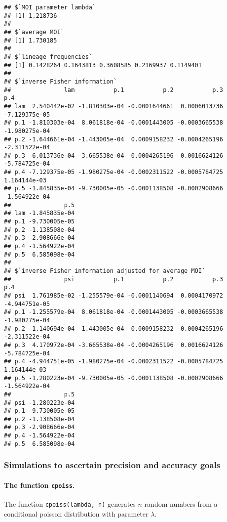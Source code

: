 \documentclass[
]{article}
\begin{document}
\begin{verbatim}
## $`MOI parameter lambda`
## [1] 1.218736
## 
## $`average MOI`
## [1] 1.730185
## 
## $`lineage frequencies`
## [1] 0.1428264 0.1643813 0.3608585 0.2169937 0.1149401
## 
## $`inverse Fisher information`
##               lam           p.1           p.2           p.3           p.4
## lam  2.540442e-02 -1.810303e-04 -0.0001644661  0.0006013736 -7.129375e-05
## p.1 -1.810303e-04  8.061818e-04 -0.0001443005 -0.0003665538 -1.980275e-04
## p.2 -1.644661e-04 -1.443005e-04  0.0009158232 -0.0004265196 -2.311522e-04
## p.3  6.013736e-04 -3.665538e-04 -0.0004265196  0.0016624126 -5.784725e-04
## p.4 -7.129375e-05 -1.980275e-04 -0.0002311522 -0.0005784725  1.164144e-03
## p.5 -1.845835e-04 -9.730005e-05 -0.0001138508 -0.0002908666 -1.564922e-04
##               p.5
## lam -1.845835e-04
## p.1 -9.730005e-05
## p.2 -1.138508e-04
## p.3 -2.908666e-04
## p.4 -1.564922e-04
## p.5  6.585098e-04
## 
## $`inverse Fisher information adjusted for average MOI`
##               psi           p.1           p.2           p.3           p.4
## psi  1.761985e-02 -1.255579e-04 -0.0001140694  0.0004170972 -4.944751e-05
## p.1 -1.255579e-04  8.061818e-04 -0.0001443005 -0.0003665538 -1.980275e-04
## p.2 -1.140694e-04 -1.443005e-04  0.0009158232 -0.0004265196 -2.311522e-04
## p.3  4.170972e-04 -3.665538e-04 -0.0004265196  0.0016624126 -5.784725e-04
## p.4 -4.944751e-05 -1.980275e-04 -0.0002311522 -0.0005784725  1.164144e-03
## p.5 -1.280223e-04 -9.730005e-05 -0.0001138508 -0.0002908666 -1.564922e-04
##               p.5
## psi -1.280223e-04
## p.1 -9.730005e-05
## p.2 -1.138508e-04
## p.3 -2.908666e-04
## p.4 -1.564922e-04
## p.5  6.585098e-04
\end{verbatim}

\hypertarget{simulations-to-ascertain-precision-and-accuracy-goals}{%
\subsubsection{Simulations to ascertain precision and accuracy
goals}\label{simulations-to-ascertain-precision-and-accuracy-goals}}

\hypertarget{the-function-cpoiss.}{%
\paragraph{\texorpdfstring{The function
\texttt{cpoiss}.}{The function cpoiss.}}\label{the-function-cpoiss.}}

The function \texttt{cpoiss(lambda,\ n)} generates \(n\) random numbers
from a conditional poisson distribution with parameter \(\lambda\).
\end{document}
